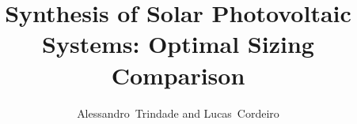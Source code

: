\documentclass[journal,onecolumn]{IEEEtran}
\begin{document}
%
\title{Synthesis of Solar Photovoltaic Systems: Optimal Sizing Comparison}
%
%
%

\author{Alessandro~Trindade and Lucas~Cordeiro}%

% 
%
\end{document}
